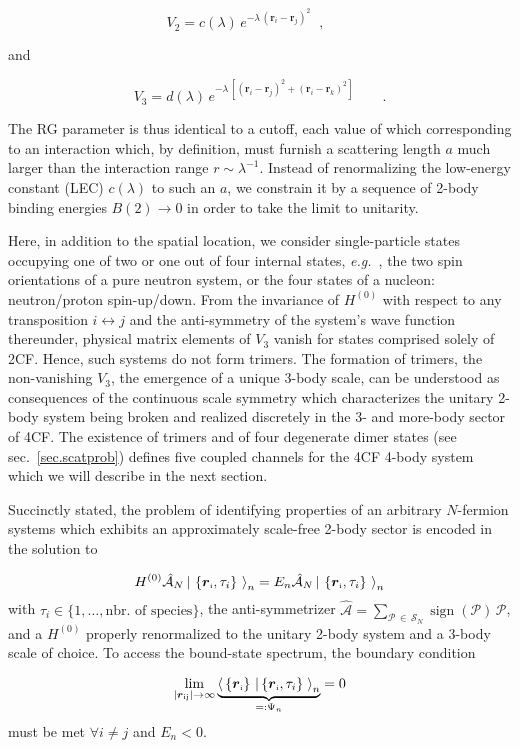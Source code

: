 \documentclass[aps,twocolumn,preprintnumbers,amsmath,amssymb,nofootinbib,superscriptaddress,notitlepage]{revtex4-1}
\newcommand{\eg}{\textit{e.g.}~}
\newcommand{\ve}[1]{\ensuremath{\boldsymbol{#1}}}
\newcommand{\be}{\begin{equation}}
\newcommand{\ee}{\end{equation}}
\newcommand{\vsp}[1]{\ensuremath{\boldsymbol{r}}_\text{\tiny #1}}
\newcommand{\la}{\label}
\newcommand{\secref}[1]{sec.~\ref{#1}}
\newcommand{\dket}[1] {\left|~#1~\right\rangle}
\newcommand{\overlap}[2] {\left\langle\,#1\,\left|\,#2\,\right.\right\rangle}
\DeclareMathOperator{\sign}{sign}
\begin{document}
\be\la{eq.2pot}
V_2 
= 
c(\lambda) \,
e^{-\lambda\,(\ve{r}_i-\ve{r}_j)^2}
\;\;
,
\qquad
\ee

and

\be\la{eq.3pot}
V_3 = 
d(\lambda)\,  
e^{-\lambda\,\left[ (\ve{r}_i-\ve{r}_j)^2 + (\ve{r}_i-\ve{r}_k)^2\right]}
\qquad
.
\ee

The RG parameter is thus identical to a cutoff, each value of which corresponding to an interaction
which, by definition, must furnish a scattering length $a$ much larger than the interaction range $r\sim\lambda^{-1}$.
Instead of renormalizing the low-energy constant (LEC) $c(\lambda)$ to such an $a$, we constrain it by
a sequence of 2-body binding energies $B(2)\to0$ in order to take the limit to unitarity.

Here, in addition to the spatial location, we consider single-particle states occupying one of two or one out of four internal states,
\eg, the two spin orientations of a pure neutron system, or the four states of a nucleon: neutron/proton spin-up/down.
From the invariance of $H^{(0)}$ with respect to any transposition $i\leftrightarrow j$ and the anti-symmetry of the system's wave function
thereunder, physical matrix elements of $V_3$ vanish for states comprised solely of 2CF. Hence, such systems
do not form trimers. The formation of trimers, the non-vanishing $V_3$, the emergence of a unique 3-body scale, can be understood
as consequences of the continuous scale symmetry which characterizes the unitary 2-body system being broken and realized
discretely in the 3- and more-body sector of 4CF.
The existence of trimers and of four degenerate dimer states (see \secref{sec.scatprob})
defines five coupled channels for the 4CF 4-body system which we will describe in the next section.

Succinctly stated, the problem of identifying properties of an arbitrary $N$-fermion systems which exhibits an approximately
scale-free 2-body sector is encoded in the solution to

\be\la{eq.sgl}
H^{(0)}
\hat{\mathcal{A}}_N
\dket{\lbrace\vsp{i},\tau_i\rbrace}_n
=
E_n
\hat{\mathcal{A}}_N
\dket{\lbrace\vsp{i},\tau_i\rbrace}_n
\ee
with $\tau_i\in\lbrace1,\ldots,\text{nbr. of species}\rbrace$,
the anti-symmetrizer $\hat{\mathcal{A}}=\sum_{\mathcal{P}\,\in\,\mathcal{S}_N}\sign(\mathcal{P})\,\mathcal{P}$,
and a $H^{(0)}$ properly renormalized to the unitary 2-body system and a 3-body scale of choice. To access the bound-state
spectrum, the boundary condition

\be\la{eq.bcbs}
\lim_{\vert\vsp{ij}\vert\to\infty}
\underbrace{
\overlap{\lbrace\vsp{i}\rbrace}{\lbrace\vsp{i},\tau_i\rbrace}_n
}_{=:\Psi_n}
=
0
\ee
must be met $\forall i\neq j$ and $E_n<0$.
\end{document}
